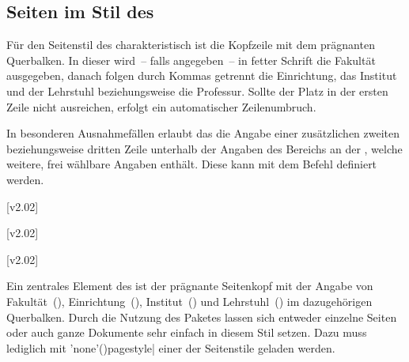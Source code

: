 \begin{DeclareEntity*}{}
\begin{DeclareEntity*}{}
\begin{DeclareEntity*}{}
\subsection{%
  Seiten im Stil des \CDs%
  \label{sec:tudheadings}%
}

\begin{Declaration}
  {}
\begin{Declaration}
  {}
\begin{Declaration}
  {}
\begin{Declaration}
  {}
\begin{Declaration}
  {}

Für den Seitenstil des \TUDCDs charakteristisch ist die Kopfzeile mit dem 
prägnanten Querbalken. In dieser wird~-- falls angegeben~-- in fetter Schrift 
die Fakultät ausgegeben, danach folgen durch Kommas getrennt die Einrichtung, 
das Institut und der Lehrstuhl beziehungsweise die Professur. Sollte der Platz 
in der ersten Zeile nicht ausreichen, erfolgt ein automatischer Zeilenumbruch.

In besonderen Ausnahmefällen erlaubt das \CD die Angabe einer zusätzlichen
zweiten beziehungsweise dritten Zeile unterhalb der Angaben des Bereichs an der 
\TnUD, welche weitere, frei wählbare Angaben enthält. Diese kann mit dem Befehl 
 definiert werden.
\end{Declaration}
\end{Declaration}
\end{Declaration}
\end{Declaration}
\end{Declaration}
%
\begin{Declaration}
  {}
  [v2.02]
\begin{Declaration}
  {}
  [v2.02]
\begin{Declaration}
  {}
  [v2.02]

%
Ein zentrales Element des \TUDCDs ist der prägnante Seitenkopf mit der Angabe 
von Fakultät~(), Einrichtung~(), 
Institut~() und Lehrstuhl~() im dazugehörigen 
Querbalken. Durch die Nutzung des Paketes  lassen 
sich entweder einzelne Seiten oder auch ganze Dokumente sehr einfach in diesem 
Stil setzen. Dazu muss lediglich mit 
\Macro'none'(){pagestyle|} einer 
der Seitenstile geladen werden. 


\end{Declaration}
\end{Declaration}
\end{Declaration}
\end{DeclareEntity*}
\end{DeclareEntity*}
\end{DeclareEntity*}
